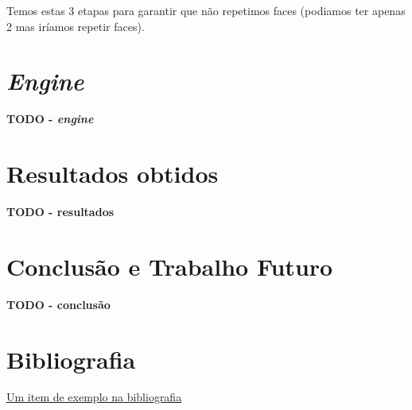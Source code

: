 \documentclass[12pt, a4paper]{article}
\begin{document}
Temos estas 3 etapas para garantir que não repetimos faces (podiamos ter apenas 2 mas iríamos
repetir faces).

\section{\emph{Engine}}

\textbf{\color{red} TODO - \emph{engine}}

\section{Resultados obtidos}

\textbf{\color{red} TODO - resultados}

\section{Conclusão e Trabalho Futuro}

\textbf{\color{red} TODO - conclusão}

\begingroup
\section{Bibliografia}
\renewcommand{\section}[2]{}

\begin{thebibliography}{9}
        \href{https://youtu.be/dQw4w9WgXcQ}{Um item de exemplo na bibliografia}
\end{thebibliography}
\endgroup
\end{document}
